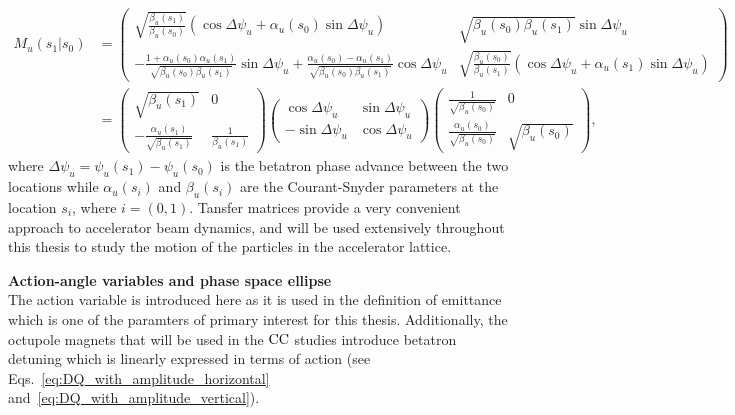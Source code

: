 \begin{equation}\label{eq:linear_transfer_matrix}
    \begin{split}
    M_u (s_1 |  s_0) &= \begin{pmatrix}
        \sqrt{\frac{\beta_u(s_1)}{\beta_u(s_0)}} (\cos{\Delta \psi_u}+\alpha_u (s_0) \sin{\Delta \psi_u}) & \sqrt{\beta_u(s_0)\beta_u(s_1)}\sin{\Delta \psi_u} \\ 
         - \frac{1+\alpha_u(s_0) \alpha_u(s_1)}{\sqrt{\beta_u(s_0) \beta_u(s_1)}} \sin{\Delta \psi_u}+ \frac{\alpha_u(s_0) - \alpha_u(s_1)}{\sqrt{\beta_u(s_0) \beta_u(s_1)}} \cos{\Delta \psi_u} & \sqrt{\frac{\beta_u(s_0)}{\beta_u(s_1)}} (\cos{\Delta \psi_u}+\alpha_u(s_1) \sin{\Delta \psi_u})
        \end{pmatrix} \\ 
        &=\begin{pmatrix}
            \sqrt{\beta_u(s_1)} & 0 \\
            -\frac{\alpha_u(s_1)}{\sqrt{\beta_u(s_1)}}& \frac{1}{\beta_u(s_1)}
            \end{pmatrix} \begin{pmatrix}
            \cos{\Delta \psi_u} & \sin{\Delta \psi_u} \\
            -\sin{\Delta \psi_u}& \cos{\Delta \psi_u}
            \end{pmatrix} \begin{pmatrix}
            \frac{1}{\sqrt{\beta_u(s_0)}} & 0 \\
            \frac{\alpha_u(s_0)}{\sqrt{\beta_u(s_0)}} & \sqrt{\beta_u(s_0)}
            \end{pmatrix},
    \end{split}
\end{equation}
where $\Delta \psi_u = \psi_u(s_1)-\psi_u(s_0)$ is the betatron phase advance between the two locations while $\alpha_u(s_i)$ and $\beta_u(s_i)$ are the Courant-Snyder parameters at the location $s_i$, where $i=(0,1)$. Tansfer matrices provide a very convenient approach to accelerator beam dynamics, and will be used extensively throughout this thesis to study the motion of the particles in the accelerator lattice.

\textbf{Action-angle variables and phase space ellipse}\\
The action variable is introduced here as it is used in the definition of emittance which is one of the paramters of primary interest for this thesis. Additionally, the octupole magnets that will be used in the ${\mathrm{CC}}$ studies introduce betatron detuning which is linearly expressed in terms of action (see Eqs.~\eqref{eq:DQ_with_amplitude_horizontal} and~\eqref{eq:DQ_with_amplitude_vertical}).

